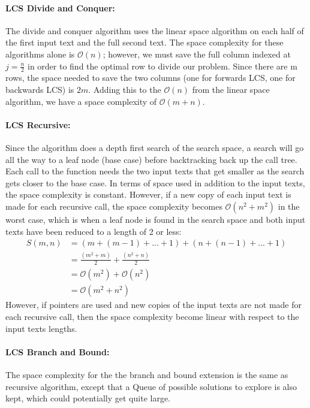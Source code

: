 \documentclass[a4paper,12pt]{article}
\newcommand{\bigO}{\mathcal{O}}
\begin{document}
			\paragraph{LCS Divide and Conquer:} The divide and conquer algorithm uses the linear space algorithm on each half of the first input text and the full second text. The space complexity for these algorithms alone is $\bigO(n)$; however, we must save the full column indexed at $j = \frac{n}{2}$ in order to find the optimal row to divide our problem. Since there are m rows, the space needed to save the two columns (one for forwards LCS, one for backwards LCS) is $2m$. Adding this to the $\bigO(n)$ from the linear space algorithm, we have a space complexity of $\bigO(m+n)$.

			\paragraph{LCS Recursive:} Since the algorithm does a depth first search of the search space, a search will go all the way to a leaf node (base case) before backtracking back up the call tree. Each call to the function needs the two input texts that get smaller as the search gets closer to the base case. In terms of space used in addition to the input texts, the space complexity is constant. However, if a new copy of each input text is made for each recursive call, the space complexity becomes $\bigO(n^2 + m^2)$ in the worst case, which is when a leaf node is found in the search space and both input texts have been reduced to a length of 2 or less:
			\begin{align*}
				S(m,n) &= (m+(m-1)+...+1) + (n+(n-1)+...+1) \\
					&= \frac{(m^2 + m)}{2}  + \frac{(n^2 + n)}{2} \\
					&= \bigO(m^2) + \bigO(n^2) \\
					&= \bigO(m^2 + n^2)
			\end{align*}
			However, if pointers are used and new copies of the input texts are not made for each recursive call, then the space complexity become linear with respect to the input texts lengths.

			\paragraph{LCS Branch and Bound:} The space complexity for the the branch and bound extension is the same as recursive algorithm, except that a Queue of possible solutions to explore is also kept, which could potentially get quite large.
\end{document}
